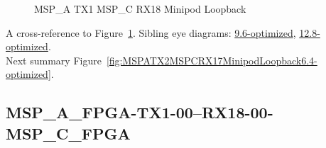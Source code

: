 \begin{figure}[h]
\begin{subfigure}{0.33\textwidth}
\hyperref[sec:MSPAFPGATX106RX1806MSPCFPGA6.4-optimized]{}
\end{subfigure}\hspace*{\fill}
\begin{subfigure}{0.33\textwidth}
\hyperref[sec:MSPAFPGATX107RX1807MSPCFPGA6.4-optimized]{}
\end{subfigure}\hspace*{\fill}
\begin{subfigure}{0.33\textwidth}
\hyperref[sec:MSPAFPGATX108RX1808MSPCFPGA6.4-optimized]{}
\end{subfigure}

\begin{subfigure}{0.33\textwidth}
\hyperref[sec:MSPAFPGATX109RX1809MSPCFPGA6.4-optimized]{}
\end{subfigure}\hspace*{\fill}
\begin{subfigure}{0.33\textwidth}
\hyperref[sec:MSPAFPGATX110RX1810MSPCFPGA6.4-optimized]{}
\end{subfigure}\hspace*{\fill}
\begin{subfigure}{0.33\textwidth}
\hyperref[sec:MSPAFPGATX111RX1811MSPCFPGA6.4-optimized]{}
\end{subfigure}

\caption{MSP\_A TX1 MSP\_C RX18 Minipod Loopback} \label{fig:MSPATX1MSPCRX18MinipodLoopback6.4-optimized}
\end{figure}

A cross-reference to Figure~\ref{fig:MSPATX1MSPCRX18MinipodLoopback6.4-optimized}.
Sibling eye diagrams: \hyperref[sec:MSPATX1MSPCRX18MinipodLoopback9.6-optimized]{9.6-optimized}, \hyperref[sec:MSPATX1MSPCRX18MinipodLoopback12.8-optimized]{12.8-optimized}. \\
Next summary Figure~\ref{fig:MSPATX2MSPCRX17MinipodLoopback6.4-optimized}.
\clearpage
% 
\subsection{MSP\_A\_FPGA-TX1-00--RX18-00-MSP\_C\_FPGA}\label{sec:MSPAFPGATX100RX1800MSPCFPGA6.4-optimized}

